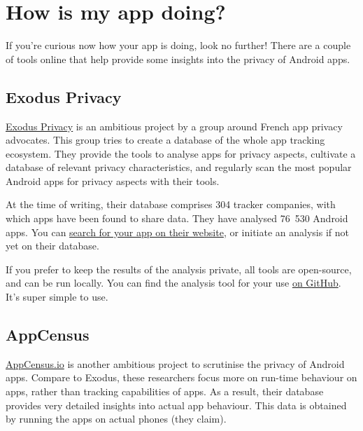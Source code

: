 \documentclass[
]{book}
\begin{document}
\hypertarget{how-is-my-app-doing}{%
\section{How is my app doing?}\label{how-is-my-app-doing}}

If you're curious now how your app is doing, look no further! There are a couple of tools online that help provide some insights into the privacy of Android apps.

\hypertarget{exodus-privacy}{%
\subsection{Exodus Privacy}\label{exodus-privacy}}

\href{https://reports.exodus-privacy.eu.org/en/}{Exodus Privacy} is an ambitious project by a group around French app privacy advocates. This group tries to create a database of the whole app tracking ecosystem. They provide the tools to analyse apps for privacy aspects, cultivate a database of relevant privacy characteristics, and regularly scan the most popular Android apps for privacy aspects with their tools.

At the time of writing, their database comprises 304 tracker companies, with which apps have been found to share data. They have analysed 76~530 Android apps. You can \href{https://reports.exodus-privacy.eu.org/en/reports/}{search for your app on their website}, or initiate an analysis if not yet on their database.

If you prefer to keep the results of the analysis private, all tools are open-source, and can be run locally. You can find the analysis tool for your use \href{https://github.com/Exodus-Privacy/exodus-standalone}{on GitHub}. It's super simple to use.

\hypertarget{appcensus}{%
\subsection{AppCensus}\label{appcensus}}

\href{https://search.appcensus.io/}{AppCensus.io} is another ambitious project to scrutinise the privacy of Android apps. Compare to Exodus, these researchers focus more on run-time behaviour on apps, rather than tracking capabilities of apps. As a result, their database provides very detailed insights into actual app behaviour. This data is obtained by running the apps on actual phones (they claim).
\end{document}
